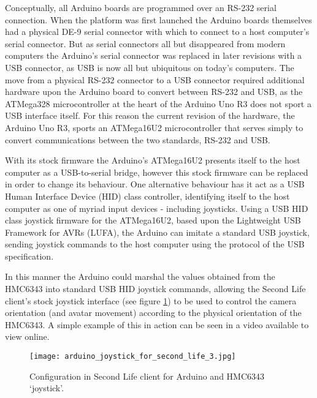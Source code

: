Conceptually, all Arduino boards are programmed over an RS-232 serial connection. When the platform was first launched the Arduino boards themselves had a physical DE-9 serial connector with which to connect to a host computer's serial connector. But as serial connectors all but disappeared from modern computers the Arduino's serial connector was replaced in later revisions with a USB connector, as USB is now all but ubiquitous on today's computers. The move from a physical RS-232 connector to a USB connector required additional hardware upon the Arduino board to convert between RS-232 and USB, as the ATMega328\atmegaTFootnote{} microcontroller at the heart of the Arduino Uno R3 does not sport a USB interface itself. For this reason the current revision of the hardware, the Arduino Uno R3, sports an ATMega16U2\atmegaFootnote{} microcontroller that serves simply to convert communications between the two standards, RS-232 and USB.

With its stock firmware the Arduino's ATMega16U2 presents itself to the host computer as a USB-to-serial bridge, however this stock firmware can be replaced in order to change its behaviour. One alternative behaviour has it act as a USB Human Interface Device (HID) class controller, identifying itself to the host computer as one of myriad input devices - including joysticks. Using a USB HID class joystick firmware for the ATMega16U2\arduinousbhidFootnote{}, based upon the Lightweight USB Framework for AVRs (LUFA)\lufaFootnote{}, the Arduino can imitate a standard USB joystick, sending joystick commands to the host computer using the protocol of the USB specification.


In this manner the Arduino could marshal the values obtained from the HMC6343 into standard USB HID joystick commands, allowing the Second Life client's stock joystick interface (see figure \ref{arduino_joystick_for_second_life_3.jpg}) to be used to control the camera orientation (and avatar movement) according to the physical orientation of the HMC6343. A simple example of this in action can be seen in a video available to view online\ArduinoJoystickVideoFootnote{}.

\begin{figure}[h]
\centering
  \texttt{[image: arduino\_joystick\_for\_second\_life\_3.jpg]}
  \caption{Configuration in Second Life client for Arduino and HMC6343 `joystick'.}
  \label{arduino_joystick_for_second_life_3.jpg}
\end{figure}

